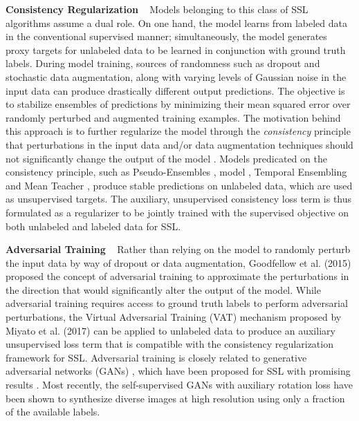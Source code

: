 \documentclass{article}
\begin{document}
\textbf{Consistency Regularization} ~ Models belonging to this class of SSL algorithms assume a dual role. On one hand, the model learns from labeled data in the conventional supervised manner; simultaneously, the model generates proxy targets for unlabeled data to be learned in conjunction with ground truth labels. During model training, sources of randomness such as dropout \cite{dropout} and stochastic data augmentation, along with varying levels of Gaussian noise in the input data can produce drastically different output predictions. The objective is to stabilize ensembles of predictions by minimizing their mean squared error over randomly perturbed and augmented training examples. The motivation behind this approach is to further regularize the model through the \emph{consistency} principle that perturbations in the input data and/or data augmentation techniques should not significantly change the output of the model \cite{consistency}. Models predicated on the consistency principle, such as Pseudo-Ensembles \cite{pea},  model \cite{consistency}, Temporal Ensembling \cite{tempens} and Mean Teacher \cite{mean-teacher}, produce stable predictions on unlabeled data, which are used as unsupervised targets. The auxiliary, unsupervised consistency loss term is thus formulated as a regularizer to be jointly trained with the supervised objective on both unlabeled and labeled data for SSL.

\textbf{Adversarial Training} ~ Rather than relying on the model to randomly perturb the input data by way of dropout or data augmentation, Goodfellow et al. (2015) \cite{goodfellow-2015} proposed the concept of adversarial training to approximate the perturbations in the direction that would significantly alter the output of the model. While adversarial training requires access to ground truth labels to perform adversarial perturbations, the Virtual Adversarial Training (VAT) mechanism proposed by Miyato et al. (2017) \cite{vat2} can be applied to unlabeled data to produce an auxiliary unsupervised loss term that is compatible with the consistency regularization framework for SSL. Adversarial training is closely related to generative adversarial networks (GANs) \cite{gans}, which have been proposed for SSL with promising results \cite{cat-gan,ssl-gans2}. Most recently, the self-supervised GANs with auxiliary rotation loss \cite{self-gan2} have been shown to synthesize diverse images at high resolution using only a fraction of the available labels.
\end{document}
